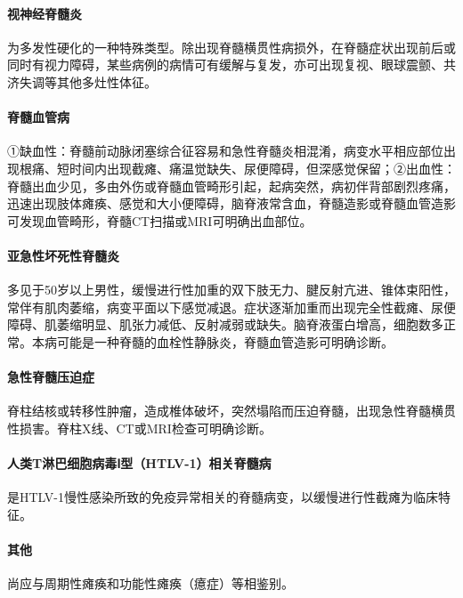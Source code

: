 \paragraph{视神经脊髓炎}

为多发性硬化的一种特殊类型。除出现脊髓横贯性病损外，在脊髓症状出现前后或同时有视力障碍，某些病例的病情可有缓解与复发，亦可出现复视、眼球震颤、共济失调等其他多灶性体征。

\paragraph{脊髓血管病}

①缺血性：脊髓前动脉闭塞综合征容易和急性脊髓炎相混淆，病变水平相应部位出现根痛、短时间内出现截瘫、痛温觉缺失、尿便障碍，但深感觉保留；②出血性：脊髓出血少见，多由外伤或脊髓血管畸形引起，起病突然，病初伴背部剧烈疼痛，迅速出现肢体瘫痪、感觉和大小便障碍，脑脊液常含血，脊髓造影或脊髓血管造影可发现血管畸形，脊髓CT扫描或MRI可明确出血部位。

\paragraph{亚急性坏死性脊髓炎}

多见于50岁以上男性，缓慢进行性加重的双下肢无力、腱反射亢进、锥体束阳性，常伴有肌肉萎缩，病变平面以下感觉减退。症状逐渐加重而出现完全性截瘫、尿便障碍、肌萎缩明显、肌张力减低、反射减弱或缺失。脑脊液蛋白增高，细胞数多正常。本病可能是一种脊髓的血栓性静脉炎，脊髓血管造影可明确诊断。

\paragraph{急性脊髓压迫症}

脊柱结核或转移性肿瘤，造成椎体破坏，突然塌陷而压迫脊髓，出现急性脊髓横贯性损害。脊柱X线、CT或MRI检查可明确诊断。

\paragraph{人类T淋巴细胞病毒Ⅰ型（HTLV-1）相关脊髓病}

是HTLV-1慢性感染所致的免疫异常相关的脊髓病变，以缓慢进行性截瘫为临床特征。

\paragraph{其他}

尚应与周期性瘫痪和功能性瘫痪（癔症）等相鉴别。

